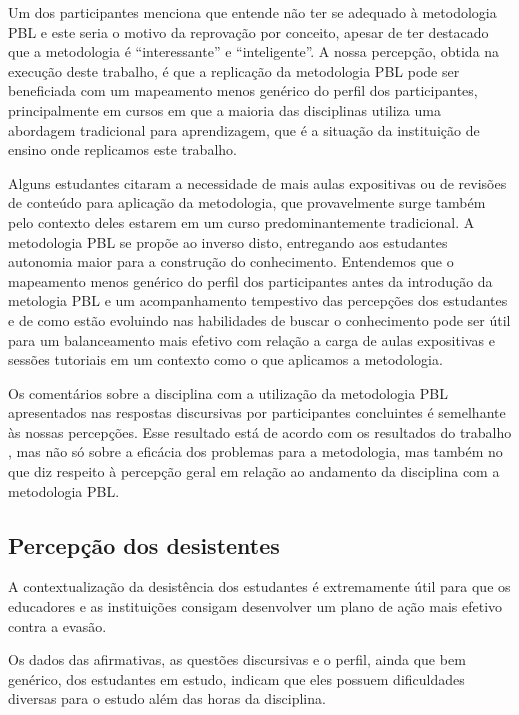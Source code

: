 Um dos participantes menciona que entende não ter se adequado
à metodologia \ac{PBL} e este seria o motivo da reprovação por conceito,
apesar de ter destacado que a metodologia é ``interessante'' e ``inteligente''.
A nossa percepção, obtida na execução deste trabalho, é que a replicação
da metodologia \ac{PBL} pode ser beneficiada com um mapeamento menos genérico
do perfil dos participantes, principalmente em cursos em que a maioria
das disciplinas utiliza uma abordagem tradicional para aprendizagem, que
é a situação da instituição de ensino onde replicamos este trabalho.

Alguns estudantes citaram a necessidade de mais aulas
expositivas ou de revisões de conteúdo para aplicação
da metodologia, que provavelmente surge também pelo
contexto deles estarem em um curso
predominantemente tradicional.
A metodologia \ac{PBL} se propõe ao inverso disto, entregando
aos estudantes autonomia maior para a construção
do conhecimento.
Entendemos que o mapeamento menos genérico do perfil
dos participantes antes da introdução da metologia \ac{PBL}
e um acompanhamento tempestivo das percepções dos estudantes
e de como estão evoluindo nas habilidades de buscar o conhecimento
pode ser útil para um balanceamento mais efetivo com
relação a carga de aulas expositivas e sessões tutoriais
em um contexto como o que aplicamos a metodologia.

Os comentários sobre a disciplina com a utilização da metodologia \ac{PBL}
apresentados nas respostas discursivas por participantes concluintes
é semelhante às nossas percepções.
Esse resultado está de acordo com os resultados do
trabalho , mas não só sobre a eficácia
dos problemas para a metodologia, mas também no que diz respeito
à percepção geral em relação ao andamento da disciplina
com a metodologia \ac{PBL}.

\subsection{Percepção dos desistentes}

A contextualização da desistência dos estudantes é extremamente útil
para que os educadores e as instituições consigam desenvolver um
plano de ação mais efetivo contra a evasão.

Os dados das afirmativas, as questões discursivas e o perfil,
ainda que bem genérico, dos estudantes em estudo, indicam que
eles possuem dificuldades diversas para o estudo além
das horas da disciplina.

